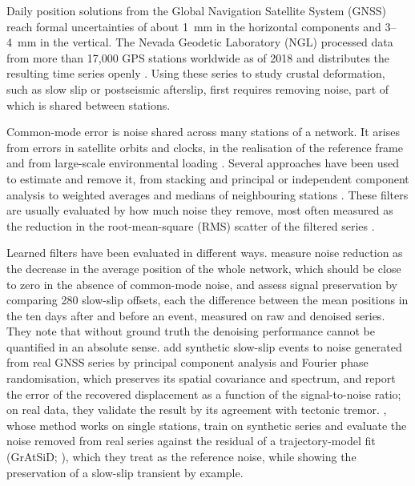 \documentclass[preprint,12pt,authoryear]{elsarticle}
\begin{document}
Daily position solutions from the Global Navigation Satellite System (GNSS) reach formal uncertainties of about 1~mm in the horizontal components and 3--4~mm in the vertical. The Nevada Geodetic Laboratory (NGL) processed data from more than 17,000 GPS stations worldwide as of 2018 and distributes the resulting time series openly \citep{blewitt2018}. Using these series to study crustal deformation, such as slow slip or postseismic afterslip, first requires removing noise, part of which is shared between stations.

Common-mode error is noise shared across many stations of a network. It arises from errors in satellite orbits and clocks, in the realisation of the reference frame and from large-scale environmental loading \citep{wdowinski1997, dong2006, kreemer2021}. Several approaches have been used to estimate and remove it, from stacking \citep{wdowinski1997} and principal or independent component analysis \citep{dong2006, gruszczynski2018, zhou2022} to weighted averages and medians of neighbouring stations \citep{tianshen2016, kreemer2021}. These filters are usually evaluated by how much noise they remove, most often measured as the reduction in the root-mean-square (RMS) scatter of the filtered series \citep{tianshen2016, kreemer2021, zhou2022}.

Learned filters have been evaluated in different ways. \citet{bachelot2025} measure noise reduction as the decrease in the average position of the whole network, which should be close to zero in the absence of common-mode noise, and assess signal preservation by comparing 280 slow-slip offsets, each the difference between the mean positions in the ten days after and before an event, measured on raw and denoised series. They note that without ground truth the denoising performance cannot be quantified in an absolute sense. \citet{costantino2024} add synthetic slow-slip events to noise generated from real GNSS series by principal component analysis and Fourier phase randomisation, which preserves its spatial covariance and spectrum, and report the error of the recovered displacement as a function of the signal-to-noise ratio; on real data, they validate the result by its agreement with tectonic tremor. \citet{mastella2025}, whose method works on single stations, train on synthetic series and evaluate the noise removed from real series against the residual of a trajectory-model fit (GrAtSiD; \citealt{bedfordbevis2018}), which they treat as the reference noise, while showing the preservation of a slow-slip transient by example.
\end{document}
